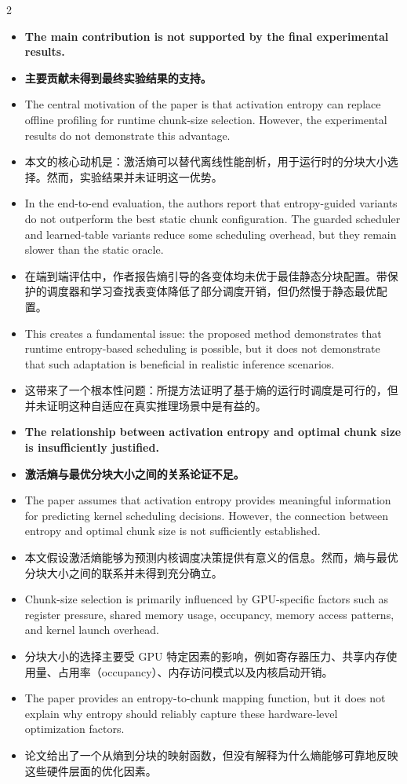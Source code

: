 \documentclass[10pt,a4paper]{article}
\newcommand{\Pair}[2]{#1\par\switchcolumn #2\par\switchcolumn*}
\newcommand{\PItem}[3]{\Pair{\begin{itemize}[label={#1}]\item #2\end{itemize}}%
                            {\begin{itemize}[label={#1}]\item #3\end{itemize}}}
\newcommand{\PCont}[2]{\Pair{\begin{itemize}[label={}]\item #1\end{itemize}}%
                            {\begin{itemize}[label={}]\item #2\end{itemize}}}
\begin{document}
\begin{paracol}{2}
\PItem{1.}{\textbf{The main contribution is not supported by the final experimental
results.}}
{\textbf{主要贡献未得到最终实验结果的支持。}}

\PCont{The central motivation of the paper is that activation entropy can replace
offline profiling for runtime chunk-size selection. However, the experimental
results do not demonstrate this advantage.}
{本文的核心动机是：激活熵可以替代离线性能剖析，用于运行时的分块大小选择。然而，实验结果并未证明这一优势。}

\PCont{In the end-to-end evaluation, the authors report that entropy-guided variants
do not outperform the best static chunk configuration. The guarded scheduler and
learned-table variants reduce some scheduling overhead, but they remain slower than
the static oracle.}
{在端到端评估中，作者报告熵引导的各变体均未优于最佳静态分块配置。带保护的调度器和学习查找表变体降低了部分调度开销，但仍然慢于静态最优配置。}

\PCont{This creates a fundamental issue: the proposed method demonstrates that
runtime entropy-based scheduling is possible, but it does not demonstrate that such
adaptation is beneficial in realistic inference scenarios.}
{这带来了一个根本性问题：所提方法证明了基于熵的运行时调度是可行的，但并未证明这种自适应在真实推理场景中是有益的。}

\PItem{2.}{\textbf{The relationship between activation entropy and optimal chunk
size is insufficiently justified.}}
{\textbf{激活熵与最优分块大小之间的关系论证不足。}}

\PCont{The paper assumes that activation entropy provides meaningful information for
predicting kernel scheduling decisions. However, the connection between entropy and
optimal chunk size is not sufficiently established.}
{本文假设激活熵能够为预测内核调度决策提供有意义的信息。然而，熵与最优分块大小之间的联系并未得到充分确立。}

\PCont{Chunk-size selection is primarily influenced by GPU-specific factors such as
register pressure, shared memory usage, occupancy, memory access patterns, and
kernel launch overhead.}
{分块大小的选择主要受 GPU 特定因素的影响，例如寄存器压力、共享内存使用量、占用率（occupancy）、内存访问模式以及内核启动开销。}

\PCont{The paper provides an entropy-to-chunk mapping function, but it does not
explain why entropy should reliably capture these hardware-level optimization
factors.}
{论文给出了一个从熵到分块的映射函数，但没有解释为什么熵能够可靠地反映这些硬件层面的优化因素。}


\end{paracol}
\end{document}
